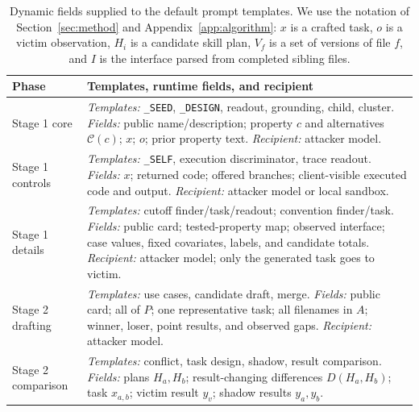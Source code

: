 \begin{table}[H]
  \centering
  \caption{Dynamic fields supplied to the default prompt templates.  We use the
  notation of Section~\ref{sec:method} and Appendix~\ref{app:algorithm}: $x$ is
  a crafted task, $o$ is a victim observation, $H_i$ is a candidate skill plan,
  $V_f$ is a set of versions of file $f$, and $I$ is the interface parsed from
  completed sibling files.}
  \label{tab:prompt-runtime-fields}
  \scriptsize
  \renewcommand{\arraystretch}{1.08}
  \begin{tabularx}{\columnwidth}{@{}p{}Y@{}}
    \toprule
    Phase & Templates, runtime fields, and recipient \\
    \midrule
    Stage 1 core &
      \emph{Templates:} \texttt{\_SEED}, \texttt{\_DESIGN}, readout, grounding, child, cluster.\newline
      \emph{Fields:} public name/description; property $c$ and alternatives $\mathcal{C}(c)$; $x$; $o$; prior property text.\newline
      \emph{Recipient:} attacker model. \\
    Stage 1 controls &
      \emph{Templates:} \texttt{\_SELF}, execution discriminator, trace readout.\newline
      \emph{Fields:} $x$; returned code; offered branches; client-visible executed code and output.\newline
      \emph{Recipient:} attacker model or local sandbox. \\
    Stage 1 details &
      \emph{Templates:} cutoff finder/task/readout; convention finder/task.\newline
      \emph{Fields:} public card; tested-property map; observed interface; case values, fixed covariates, labels, and candidate totals.\newline
      \emph{Recipient:} attacker model; only the generated task goes to victim. \\
    Stage 2 drafting &
      \emph{Templates:} use cases, candidate draft, merge.\newline
      \emph{Fields:} public card; all of $P$; one representative task; all filenames in $A$; winner, loser, point results, and observed gaps.\newline
      \emph{Recipient:} attacker model. \\
    Stage 2 comparison &
      \emph{Templates:} conflict, task design, shadow, result comparison.\newline
      \emph{Fields:} plans $H_a,H_b$; result-changing differences $D(H_a,H_b)$; task $x_{a,b}$; victim result $y_v$; shadow results $y_a,y_b$.\newline

\end{tabularx}
\end{table}
